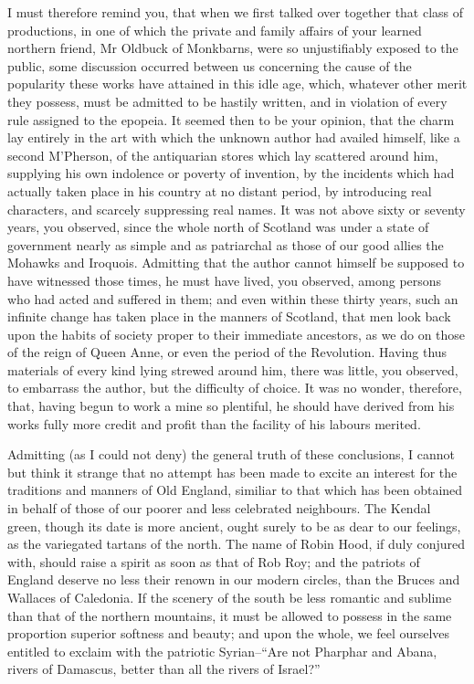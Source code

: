 I must therefore remind you, that when we first talked over together
that class of productions, in one of which the private and family
affairs of your learned northern friend, Mr Oldbuck of Monkbarns, were
so unjustifiably exposed to the public, some discussion occurred between
us concerning the cause of the popularity these works have attained in
this idle age, which, whatever other merit they possess, must be
admitted to be hastily written, and in violation of every rule assigned
to the epopeia. It seemed then to be your opinion, that the charm lay
entirely in the art with which the unknown author had availed himself,
like a second M'Pherson, of the antiquarian stores which lay scattered
around him, supplying his own indolence or poverty of invention, by the
incidents which had actually taken place in his country at no distant
period, by introducing real characters, and scarcely suppressing real
names. It was not above sixty or seventy years, you observed, since the
whole north of Scotland was under a state of government nearly as simple
and as patriarchal as those of our good allies the Mohawks and Iroquois.
Admitting that the author cannot himself be supposed to have witnessed
those times, he must have lived, you observed, among persons who had
acted and suffered in them; and even within these thirty years, such an
infinite change has taken place in the manners of Scotland, that men
look back upon the habits of society proper to their immediate
ancestors, as we do on those of the reign of Queen Anne, or even the
period of the Revolution. Having thus materials of every kind lying
strewed around him, there was little, you observed, to embarrass the
author, but the difficulty of choice. It was no wonder, therefore, that,
having begun to work a mine so plentiful, he should have derived from
his works fully more credit and profit than the facility of his labours
merited.

Admitting (as I could not deny) the general truth of these conclusions,
I cannot but think it strange that no attempt has been made to excite an
interest for the traditions and manners of Old England, similiar to that
which has been obtained in behalf of those of our poorer and less
celebrated neighbours. The Kendal green, though its date is more
ancient, ought surely to be as dear to our feelings, as the variegated
tartans of the north. The name of Robin Hood, if duly conjured with,
should raise a spirit as soon as that of Rob Roy; and the patriots of
England deserve no less their renown in our modern circles, than the
Bruces and Wallaces of Caledonia. If the scenery of the south be less
romantic and sublime than that of the northern mountains, it must be
allowed to possess in the same proportion superior softness and beauty;
and upon the whole, we feel ourselves entitled to exclaim with the
patriotic Syrian--``Are not Pharphar and Abana, rivers of Damascus,
better than all the rivers of Israel?''

